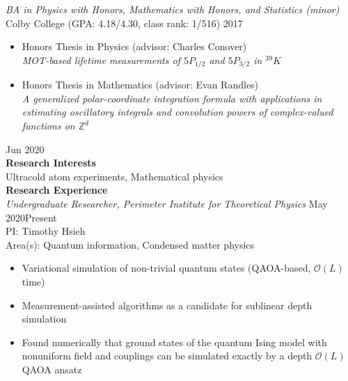 \documentclass[10pt]{article}
\begin{document}
\noindent \textit{BA in Physics with Honors, Mathematics with Honors, and Statistics (minor)}\\
Colby College (GPA: 4.18/4.30, class rank: 1/516) \hfill 2017\vspace{-2pt}

\begin{itemize}
	\setlength\itemsep{-1pt}
	\item Honors Thesis in Physics (advisor: Charles Conover)\\
	\textit{MOT-based lifetime measurements of $5P_{1/2}$ and $5P_{3/2}$ in $^{39}K$}
	
	\item Honors Thesis in Mathematics (advisor: Evan Randles)\\ 
	\indent \textit{A generalized polar-coordinate integration formula with applications in estimating oscillatory integrals and convolution powers of complex-valued functions on $\mathbb{Z}^d$}
\end{itemize}



\hfill  Jun 2020\\




\noindent \large{\textbf{{Research Interests}}}   \normalsize \\  
\noindent Ultracold atom experiments, Mathematical physics\\



\noindent \large{\textbf{{Research Experience}}}   \normalsize \\  
\noindent \textit{Undergraduate Researcher, Perimeter Institute for Theoretical Physics} \hfill May 2020\textendash Present\\
PI: Timothy Hsieh \\
Area(s): Quantum information, Condensed matter physics \vspace{-5pt}
\begin{itemize}
	\setlength\itemsep{-4pt}
	\item Variational simulation of non-trivial quantum states (QAOA-based, $\mathcal{O}(L)$ time)  
	\item Measurement-assisted algorithms as a candidate for sublinear depth simulation  
	\item Found numerically that ground states of the quantum Ising model with nonuniform field and couplings can be simulated exactly by a depth $\mathcal{O}(L)$ QAOA ansatz
\end{itemize}
\end{document}
